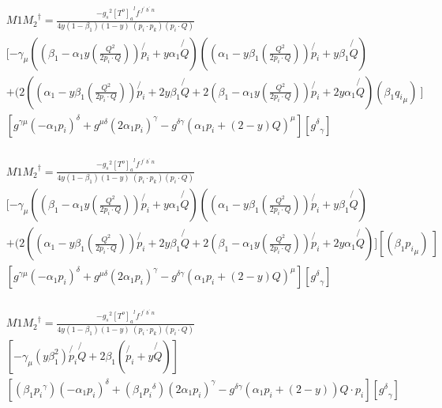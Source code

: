 \begin{equation}
\begin{split}
&M1{M_2}^{\dagger}=\frac{-{g_s}^2 {[T^{o}]_a}^{l} f^{\:f^{\prime}\: b^{\prime}\:n}}{4 y(1-\beta_1) (1-y)\:(p_i \cdot p_k)(p_i \cdot Q)}\\
&[-\gamma_{\mu}((\beta_1 -\alpha_1 y(\frac{Q^2}{2p_i \cdot Q}))\not{p_i} + y\alpha_1\not{Q})((\alpha_1 -y\beta_1(\frac{Q^2}{2p_i \cdot Q})) \not{p_i} + y\beta_1\not{Q})\\
&+(2((\alpha_1 -y\beta_1(\frac{Q^2}{2p_i \cdot Q})) \not{p_i} + 2y\beta_1\not{Q}+2(\beta_1 -\alpha_1 y(\frac{Q^2}{2p_i \cdot Q}))\not{p_i} + 2y\alpha_1\not{Q})(\beta_1{q_i}_{\mu})\:]\\
&[ g^{{{\gamma}}{{\mu}}}(-\alpha_1p_i)^{\delta}+g^{{{\mu}}{{\delta}}}(2\alpha_1p_i )^{{\gamma}}-g^{\delta{{\gamma}}}(\alpha_1p_i+(2-y)Q)^{{\mu}}][{g^{\delta}}_{\gamma}]\\
\end{split}
\end{equation}

\begin{equation}
\begin{split}
&M1{M_2}^{\dagger}=\frac{-{g_s}^2 {[T^{o}]_a}^{l} f^{\:f^{\prime}\: b^{\prime}\:n}}{4 y(1-\beta_1) (1-y)\:(p_i \cdot p_k)(p_i \cdot Q)}\\
&[-\gamma_{\mu}((\beta_1 -\alpha_1 y(\frac{Q^2}{2p_i \cdot Q}))\not{p_i} + y\alpha_1\not{Q})((\alpha_1 -y\beta_1(\frac{Q^2}{2p_i \cdot Q})) \not{p_i} + y\beta_1\not{Q})\\
&+(2((\alpha_1 -y\beta_1(\frac{Q^2}{2p_i \cdot Q})) \not{p_i} + 2y\beta_1\not{Q}+2(\beta_1 -\alpha_1 y(\frac{Q^2}{2p_i \cdot Q}))\not{p_i} + 2y\alpha_1\not{Q})][(\beta_1{p_i}_{\mu})\:]\\
&[ g^{{{\gamma}}{{\mu}}}(-\alpha_1p_i)^{\delta}+g^{{{\mu}}{{\delta}}}(2\alpha_1p_i )^{{\gamma}}-g^{\delta{{\gamma}}}(\alpha_1p_i+(2-y)Q)^{{\mu}}][{g^{\delta}}_{\gamma}]\\
\end{split}
\end{equation}

\begin{equation}
\begin{split}
&M1{M_2}^{\dagger}=\frac{-{g_s}^2 {[T^{o}]_a}^{l} f^{\:f^{\prime}\: b^{\prime}\:n}}{4 y(1-\beta_1) (1-y)\:(p_i \cdot p_k)(p_i \cdot Q)}\\
&[-\gamma_{\mu}(y\beta_1^2)\not{p_i}\not{Q}+2\beta_1(\not{p_i}+y\not{Q})]\\
&[(\beta_1{p_i}^{\gamma}) (-\alpha_1p_i)^{\delta}+(\beta_1{p_i}^{\delta})(2\alpha_1p_i )^{{\gamma}}-g^{\delta{{\gamma}}}(\alpha_1p_i+(2-y))Q\cdot p_i][{g^{\delta}}_{\gamma}]\\
\end{split}
\end{equation}

